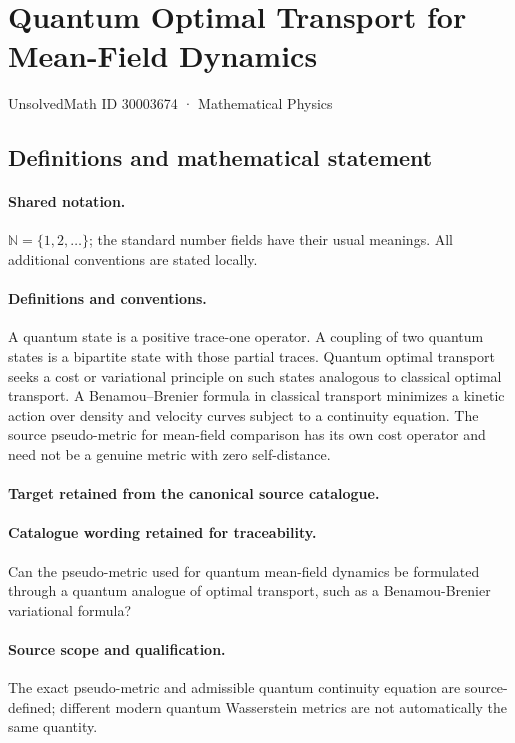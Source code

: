 \documentclass[11pt]{article}
\begin{document}
\setcounter{section}{30003673}
\section{Quantum Optimal Transport for Mean-Field Dynamics}\label{30003674}
{\small UnsolvedMath ID 30003674 · Mathematical Physics}
\subsection{Definitions and mathematical statement}

\paragraph{Shared notation.}$\mathbb N=\{1,2,\ldots\}$; the standard number fields have their usual meanings. All additional conventions are stated locally.


\paragraph{Definitions and conventions.}
A quantum state is a positive trace-one operator. A coupling of two quantum states is a bipartite state with those partial traces. Quantum optimal transport seeks a cost or variational principle on such states analogous to classical optimal transport. A Benamou--Brenier formula in classical transport minimizes a kinetic action over density and velocity curves subject to a continuity equation. The source pseudo-metric for mean-field comparison has its own cost operator and need not be a genuine metric with zero self-distance.

\paragraph{Target retained from the canonical source catalogue.}
\paragraph{Catalogue wording retained for traceability.}
Can the pseudo-metric used for quantum mean-field dynamics be formulated through a quantum analogue of optimal transport, such as a Benamou-Brenier variational formula?

\paragraph{Source scope and qualification.}
The exact pseudo-metric and admissible quantum continuity equation are source-defined; different modern quantum Wasserstein metrics are not automatically the same quantity.
\end{document}
